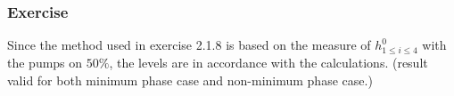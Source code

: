 \subsubsection{Exercise}

Since the method used in exercise 2.1.8 is based on the measure of $h_{1\leq i \leq 4}^0$ with the pumps on $50\%$, the levels are in accordance with the calculations. 
(result valid for both minimum phase case and non-minimum phase case.)
